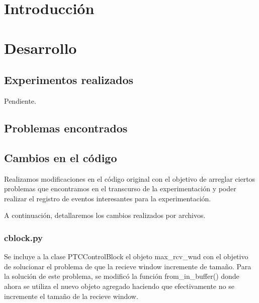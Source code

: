 \documentclass[a4paper, 10pt, twoside]{article}
\begin{document}
\newpage




\tableofcontents

\newpage




\section{Introducción}
\label{sec:introduccion}



\section{Desarrollo}
\label{sec:desarrollo}


\subsection{Experimentos realizados}

Pendiente.


\subsection{Problemas encontrados}


\subsection{Cambios en el código}
Realizamos modificaciones en el código original con el objetivo de arreglar ciertos problemas que encontramos en el transcurso de la experimentación y poder realizar
el registro de eventos interesantes para la experimentación.

A continuación, detallaremos los cambios realizados por archivos.

\subsubsection{cblock.py}
Se incluye a la clase PTCControlBlock el objeto max\_rcv\_wnd con el objetivo de solucionar el problema de que la recieve window incremente de tamaño. Para la solución de este problema, se modificó la función from\_in\_buffer() donde ahora se utiliza el nuevo objeto agregado haciendo que efectivamente no se incremente el tamaño de la recieve window.
\end{document}
